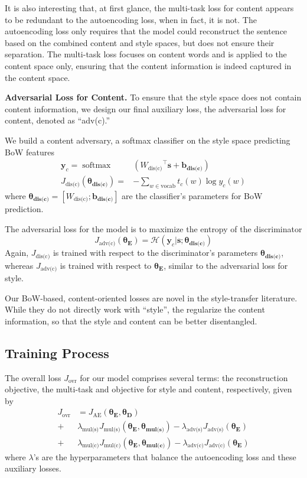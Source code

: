 \documentclass[11pt,a4paper]{article}
\newcommand{\loss}[1]{J_{\text{#1}}}
\newcommand{\hyp}[1]{\lambda_{\text{#1}}}
\newcommand{\nnweight}[1]{\bm{\theta_{\text{#1}}}}
\newcommand{\weight}[1]{W_{\text{#1}}}
\newcommand{\bias}[1]{\bm{b_{\text{#1}}}}
\begin{document}
It is also interesting that, at first glance, the multi-task loss for content appears to be redundant to the autoencoding loss, when in fact, it is not.  The autoencoding loss only requires that the model could reconstruct the sentence based on the combined content and style spaces, but does not ensure their separation. The multi-task loss focuses on content words and is applied to the content space only, ensuring that the content information is indeed captured in the content space.

\textbf{Adversarial Loss for Content.} To ensure that the style space does not contain content information, we design our final auxiliary loss, the adversarial loss for content, denoted as ``adv(c).''

We build a content adversary, a softmax classifier on the style space predicting BoW features
\begin{align}
	\label{eqn:adv-bow-disc-loss}
	\bm y_c   = \operatorname{softmax} & ({\weight{dis(c)}}^\top \bm s + \bias{dis(c)})     \\
	\loss{dis(c)}(\nnweight{dis(c)}) = & - \sum\limits_{w\in\text{vocab}} t_c(w)\log y_c(w)
\end{align}
where $\nnweight{dis(c)}=[\weight{dis(c)}; \bias{dis(c)}]$ are the classifier's parameters for BoW prediction.

The adversarial loss for the model is to maximize the entropy of the discriminator
\begin{equation}
	\loss{adv(c)}(\nnweight{E}) = \mathcal{H}(\bm y_c | \bm s; \nnweight{dis(c)})
\end{equation}
Again, $\loss{dis(c)}$ is trained with respect to the discriminator's parameters $\nnweight{dis(c)}$, whereas $\loss{adv(c)}$ is trained with respect to $\nnweight{E}$, similar to the adversarial loss for style.

Our BoW-based, content-oriented losses are novel in the style-transfer literature.
While they do not directly work with ``style'', the regularize the content information, so that the style and content can be better disentangled.


\subsection{Training Process}

The overall loss $\loss{ovr}$ for our model comprises several terms: the reconstruction objective, the multi-task and objective for style and content, respectively, given by
\begin{align}
	\loss{ovr} & =  \loss{AE}(\nnweight{E}, \nnweight{D})                                                                         \\
	+          & \hyp{mul(s)} \loss{mul(s)} (\nnweight{E},\nnweight{mul(s)}) - \hyp{adv(s)} \loss{adv(s)}(\nnweight{E}) \nonumber \\
	+          & \hyp{mul(c)} \loss{mul(c)} (\nnweight{E},\nnweight{mul(c)}) - \hyp{adv(c)} \loss{adv(c)}(\nnweight{E}) \nonumber
\end{align}
where $\lambda$'s are the hyperparameters that balance the autoencoding loss and these auxiliary losses.
\end{document}
